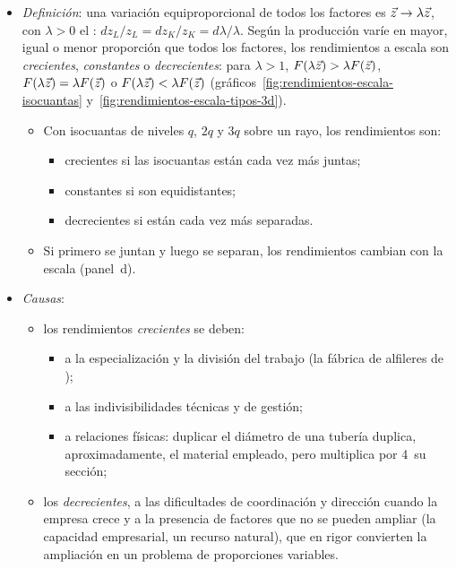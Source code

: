\documentclass[11pt]{article}
\begin{document}
\begin{itemize}
\item \emph{Definición}: una variación equiproporcional de todos los factores es $\vec{z}\to\lambda\vec{z}$, con $\lambda>0$ el : $dz_L/z_L=dz_K/z_K=d\lambda/\lambda$. Según la producción varíe en mayor, igual o menor proporción que todos los factores, los rendimientos a escala son \emph{crecientes}, \emph{constantes} o \emph{decrecientes}: para $\lambda>1$, $F(\lambda\vec{z})>\lambda F(\vec{z})$, $F(\lambda\vec{z})=\lambda F(\vec{z})$ o $F(\lambda\vec{z})<\lambda F(\vec{z})$ (gráficos~\ref{fig:rendimientos-escala-isocuantas} y~\ref{fig:rendimientos-escala-tipos-3d}).
  \begin{itemize}
  \item Con isocuantas de niveles $q$, $2q$ y $3q$ sobre un rayo, los rendimientos son:
    \begin{itemize}
    \item crecientes si las isocuantas están cada vez más juntas;
    \item constantes si son equidistantes;
    \item decrecientes si están cada vez más separadas.
    \end{itemize}
  \item Si primero se juntan y luego se separan, los rendimientos cambian con la escala (panel~d).
  \end{itemize}
\item \emph{Causas}\nocite{Varian1992Microeconomic}:
  \begin{itemize}
  \item los rendimientos \emph{crecientes} se deben:
    \begin{itemize}
    \item a la especialización y la división del trabajo (la fábrica de alfileres de );
    \item a las indivisibilidades técnicas y de gestión;
    \item a relaciones físicas: duplicar el diámetro de una tubería duplica, aproximadamente, el material empleado, pero multiplica por 4~su sección;
    \end{itemize}
  \item los \emph{decrecientes}, a las dificultades de coordinación y dirección cuando la empresa crece y a la presencia de factores que no se pueden ampliar (la capacidad empresarial, un recurso natural), que en rigor convierten la ampliación en un problema de proporciones variables.
  \end{itemize}
\end{itemize}
\end{document}
